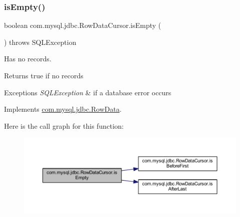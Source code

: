 \mbox{\label{classcom_1_1mysql_1_1jdbc_1_1_row_data_cursor_a80a9aff446cac640c3259b3c6f53b716}} 
\subsubsection{\texorpdfstring{is\+Empty()}{isEmpty()}}
{\footnotesize\ttfamily boolean com.\+mysql.\+jdbc.\+Row\+Data\+Cursor.\+is\+Empty (\begin{DoxyParamCaption}{ }\end{DoxyParamCaption}) throws S\+Q\+L\+Exception}

Has no records.

\begin{DoxyReturn}{Returns}
true if no records 
\end{DoxyReturn}

\begin{DoxyExceptions}{Exceptions}
{\em S\+Q\+L\+Exception} & if a database error occurs \\
\hline
\end{DoxyExceptions}


Implements \mbox{\hyperlink{interfacecom_1_1mysql_1_1jdbc_1_1_row_data_afe25c16468d9db9d9458db7b1c6004f1}{com.\+mysql.\+jdbc.\+Row\+Data}}.

Here is the call graph for this function\+:
\nopagebreak
\begin{figure}[H]
\begin{center}
\leavevmode
\includegraphics[width=350pt]{classcom_1_1mysql_1_1jdbc_1_1_row_data_cursor_a80a9aff446cac640c3259b3c6f53b716_cgraph}
\end{center}
\end{figure}
\mbox{\label{classcom_1_1mysql_1_1jdbc_1_1_row_data_cursor_a6df7eb0ab6cebd6c865d86bee9b43d7f}} 
